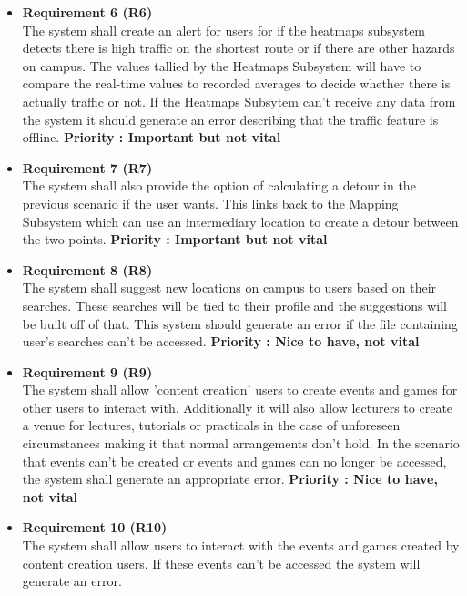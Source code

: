 \documentclass[english]{article}
\begin{document}
\begin{itemize}
					    \item \textbf{Requirement 6 (R6)}\\ The system shall create an alert for users for if the heatmaps subsystem detects there is high traffic on the shortest route or if there are other hazards on campus. The values tallied by the Heatmaps Subsystem will have to compare the real-time values to recorded averages to decide whether there is actually traffic or not. If the Heatmaps Subsytem can't receive any data from the system it should generate an error describing that the traffic feature is offline. \textbf{Priority : Important but not vital}
					    \item \textbf{Requirement 7 (R7)}\\ The system shall also provide the option of calculating a detour in the previous scenario if the user wants. This links back to the Mapping Subsystem which can use an intermediary location to create a detour between the two points. \textbf{Priority : Important but not vital}
					    \item \textbf{Requirement 8 (R8)}\\ The system shall suggest new locations on campus to users based on their searches. These searches will be tied to their profile and the suggestions will be built off of that. This system should generate an error if the file containing user's searches can't be accessed. \textbf{Priority : Nice to have, not vital}
					    \item \textbf{Requirement 9 (R9)}\\ The system shall allow 'content creation' users to create events and games for other users to interact with. Additionally it will also allow lecturers to create a venue for lectures, tutorials or practicals in the case of unforeseen circumstances making it that normal arrangements don't hold. In the scenario that events can't be created or events and games can no longer be accessed, the system shall generate an appropriate error. 
					    \textbf{Priority : Nice to have, not vital}
					    \item \textbf{Requirement 10 (R10)} \\ The system shall allow users to interact with the events and games created by content creation users. If these events can't be accessed the system will generate
					    an error.
					\end{itemize}
\end{document}
